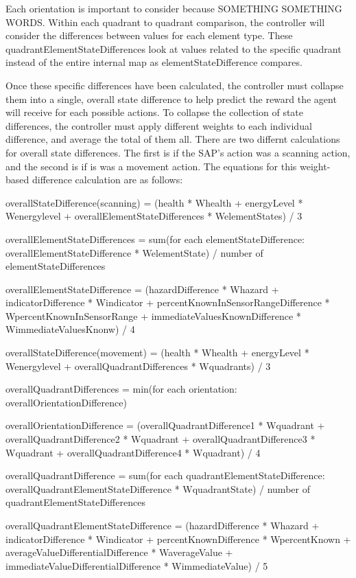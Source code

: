 
Each orientation is important to consider because SOMETHING SOMETHING WORDS.
Within each quadrant to quadrant comparison, the controller will consider the differences between values for each element type.
These quadrantElementStateDifferences look at values related to the specific quadrant instead of the entire internal map as elementStateDifference compares.

Once these specific differences have been calculated, the controller must collapse them into a single, overall state difference to help predict the reward the agent will receive for each possible actions.
To collapse the collection of state differences, the controller must apply different weights to each individual difference, and average the total of them all.
There are two differnt calculations for overall state differences.
The first is if the SAP's action was a scanning action, and the second is if is was a movement action.
The equations for this weight-based difference calculation are as follows:

overallStateDifference(scanning) = (health * Whealth + energyLevel * Wenergylevel + overallElementStateDifferences * WelementStates) / 3

overallElementStateDifferences = sum(for each elementStateDifference: overallElementStateDifference * WelementState) / number of elementStateDifferences

overallElementStateDifference = (hazardDifference * Whazard + indicatorDifference * Windicator + percentKnownInSensorRangeDifference * WpercentKnownInSensorRange + immediateValuesKnownDifference * WimmediateValuesKnonw) / 4

overallStateDifference(movement) = (health * Whealth + energyLevel * Wenergylevel + overallQuadrantDifferences * Wquadrants) / 3

overallQuadrantDifferences = min(for each orientation: overallOrientationDifference)

overallOrientationDifference = (overallQuadrantDifference1 * Wquadrant + overallQuadrantDifference2 * Wquadrant + overallQuadrantDifference3 * Wquadrant + overallQuadrantDifference4 * Wquadrant) / 4

overallQuadrantDifference = sum(for each quadrantElementStateDifference: overallQuadrantElementStateDifference * WquadrantState) / number of quadrantElementStateDifferences

overallQuadrantElementStateDifference = (hazardDifference * Whazard + indicatorDifference * Windicator + percentKnownDifference * WpercentKnown + averageValueDifferentialDifference * WaverageValue + immediateValueDifferentialDifference * WimmediateValue) / 5



